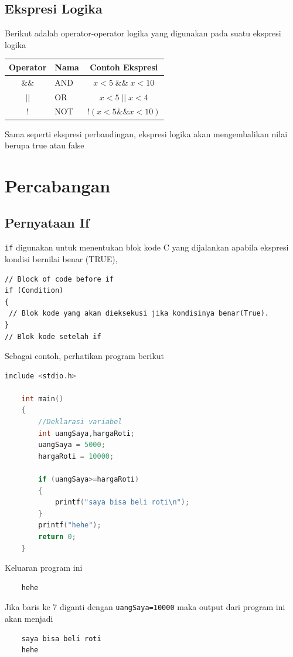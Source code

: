 \subsection{Ekspresi Logika}
Berikut adalah operator-operator logika yang digunakan pada suatu ekspresi logika
\begin{center}
	\begin{tabular}{|c|l|c|}
		\hline
		Operator & \multicolumn{1}{c|}{Nama} & Contoh Ekspresi        \\ \hline
		$\&\&$   & AND                       & $x<5\; \&\& \;x<10$    \\ \hline
		$||$     & OR                        & $x < 5\; ||\; x < 4  $ \\ \hline
		$!$      & NOT                       & $!(x <5 \&\& x < 10) $ \\ \hline
	\end{tabular}
\end{center}
Sama seperti ekspresi perbandingan, ekspresi logika akan mengembalikan nilai berupa true atau false

\section{Percabangan}
\subsection{Pernyataan If}
\verb*|if| digunakan untuk menentukan blok kode C yang dijalankan apabila ekspresi kondisi bernilai benar (TRUE),
\begin{verbatim}
// Block of code before if
if (Condition) 
{
 // Blok kode yang akan dieksekusi jika kondisinya benar(True).
}
// Blok kode setelah if
\end{verbatim}
Sebagai contoh, perhatikan program berikut
\begin{lstlisting}[language=c,caption =Contoh Pernyataan If,label=lst:ifexample01]
	include <stdio.h>
	
	int main()
	{
		//Deklarasi variabel 
		int uangSaya,hargaRoti;
		uangSaya = 5000;
		hargaRoti = 10000;
		
		if (uangSaya>=hargaRoti)
		{
		    printf("saya bisa beli roti\n");
		}
		printf("hehe");
		return 0;
	}
\end{lstlisting}
Keluaran program ini
\begin{verbatim}
    hehe
\end{verbatim}
Jika baris ke 7 diganti dengan \verb|uangSaya=10000| maka output dari program ini akan menjadi
\begin{verbatim}
    saya bisa beli roti
    hehe
\end{verbatim}

